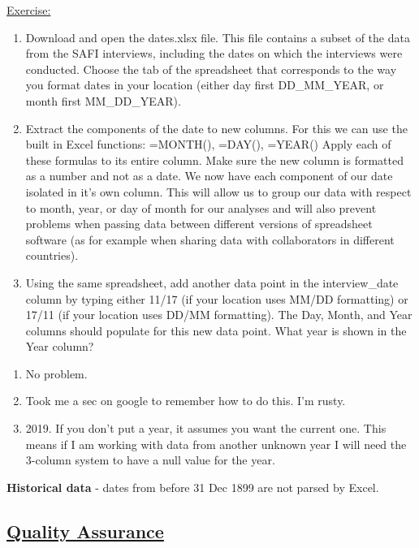 \documentclass[12pt]{article}
\begin{document}
\color{gray}
\underline{Exercise:}
\begin{enumerate}
    \item Download and open the dates.xlsx file. This file contains a subset of the data from the SAFI interviews, including the dates on which the interviews were conducted.
    \newline Choose the tab of the spreadsheet that corresponds to the way you format dates in your location (either day first DD\_MM\_YEAR, or month first MM\_DD\_YEAR).
    \item Extract the components of the date to new columns. For this we can use the built in Excel functions:
    \newline =MONTH(), =DAY(), =YEAR()
    \newline Apply each of these formulas to its entire column. Make sure the new column is formatted as a number and not as a date.
    \newline We now have each component of our date isolated in it’s own column. This will allow us to group our data with respect to month, year, or day of month for our analyses and will also prevent problems when passing data between different versions of spreadsheet software (as for example when sharing data with collaborators in different countries).
    \item Using the same spreadsheet, add another data point in the interview\_date column by typing either 11/17 (if your location uses MM/DD formatting) or 17/11 (if your location uses DD/MM formatting). The Day, Month, and Year columns should populate for this new data point. What year is shown in the Year column?
\end{enumerate}
\color{black}
\begin{enumerate}
    \item No problem.
    \item Took me a sec on google to remember how to do this. I'm rusty.
    \item 2019. If you don't put a year, it assumes you want the current one. This means if I am working with data from another unknown year I will need the 3-column system to have a null value for the year.
\end{enumerate}

\textbf{Historical data} - dates from before 31 Dec 1899 are not parsed by Excel. 

\newpage
\subsection{\href{https://datacarpentry.org/spreadsheets-socialsci/04-quality-assurance/index.html}{\textbf{Quality Assurance}}}
\end{document}
